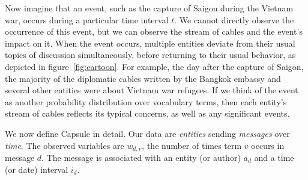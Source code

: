 Now imagine that an event, such as the capture of Saigon during the
Vietnam war, occurs during a particular time interval $t$. We cannot
directly observe the occurrence of this event, but we can observe the
stream of cables and the event's impact on it. When the event occurs,
multiple entities deviate from their usual topics of discussion
simultaneously, before returning to their usual behavior, as depicted
in figure~\ref{fig:cartoon}. For example, the day after the capture of
Saigon, the majority of the diplomatic cables written by the Bangkok
embassy and several other entities were about Vietnam war refugees. If
we think of the event as another probability distribution over
vocabulary terms, then each entity's stream of cables reflects its
typical concerns, as well as any significant events.




We now define Capsule in detail. Our data are \textit{entities}
sending \textit{messages} over \textit{time}. The observed variables
are $w_{d,v}$, the number of times term $v$ occurs in message $d$. The
message is associated with an entity (or author) $a_d$ and a time (or
date) interval $i_d$.

